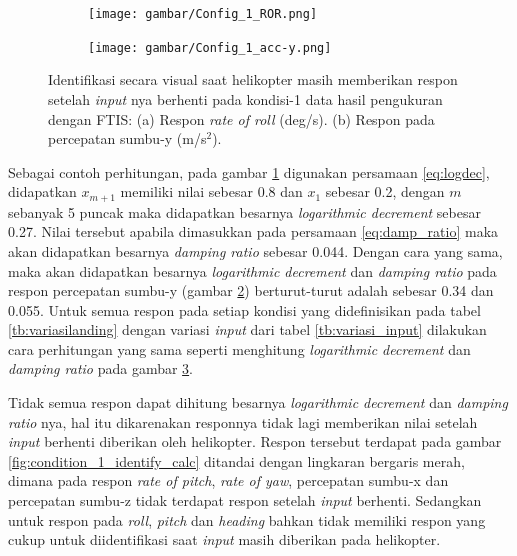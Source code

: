 \begin{figure}[H]
	\centering 
	\begin{subfigure}{0.48\textwidth}
		\centering
		\texttt{[image: gambar/Config\_1\_ROR.png]}
		\caption{}
		\label{fig:condition_1_ROR}
	\end{subfigure}
	\centering
	\begin{subfigure}{0.48\textwidth}
		\centering
		\texttt{[image: gambar/Config\_1\_acc-y.png]}
		\caption{}
		\label{fig:condition_1_acc-y}	
	\end{subfigure}
	\caption{Identifikasi secara visual saat helikopter masih memberikan respon setelah \textit{input} nya berhenti pada kondisi-1 data hasil pengukuran dengan FTIS: (a) Respon \textit{rate of roll} (deg/s). (b) Respon pada percepatan sumbu-y (m/s$^2$).}
	\label{fig:identifikasi_config1}
\end{figure}

Sebagai contoh perhitungan, pada gambar \ref{fig:condition_1_ROR} digunakan persamaan \ref{eq:logdec}, didapatkan $x_{m+1}$ memiliki nilai sebesar 0.8 dan $x_1$ sebesar 0.2, dengan $m$ sebanyak 5 puncak maka didapatkan besarnya \textit{logarithmic decrement} sebesar 0.27. Nilai tersebut apabila dimasukkan pada persamaan \ref{eq:damp_ratio} maka akan didapatkan besarnya \textit{damping ratio} sebesar 0.044. Dengan cara yang sama, maka akan didapatkan besarnya \textit{logarithmic decrement} dan \textit{damping ratio} pada respon percepatan sumbu-y (gambar \ref{fig:condition_1_acc-y}) berturut-turut adalah sebesar 0.34 dan 0.055. Untuk semua respon pada setiap kondisi yang didefinisikan pada tabel \ref{tb:variasilanding} dengan variasi \textit{input} dari tabel \ref{tb:variasi_input} dilakukan cara perhitungan yang sama seperti menghitung \textit{logarithmic decrement} dan \textit{damping ratio} pada gambar \ref{fig:identifikasi_config1}.

Tidak semua respon dapat dihitung besarnya \textit{logarithmic decrement} dan \textit{damping ratio} nya, hal itu dikarenakan responnya tidak lagi memberikan nilai setelah \textit{input} berhenti diberikan oleh helikopter. Respon tersebut terdapat pada gambar \ref{fig:condition_1_identify_calc} ditandai dengan lingkaran bergaris merah, dimana pada respon \textit{rate of pitch}, \textit{rate of yaw}, percepatan sumbu-x dan percepatan sumbu-z tidak terdapat respon setelah \textit{input} berhenti. Sedangkan untuk respon pada \textit{roll}, \textit{pitch} dan \textit{heading} bahkan tidak memiliki respon yang cukup untuk diidentifikasi saat \textit{input} masih diberikan pada helikopter.

